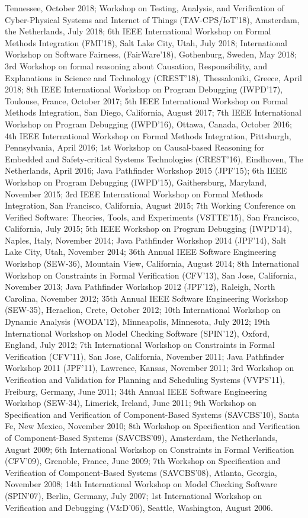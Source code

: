 \documentclass[ComputerScience]{vita}
\begin{document}
\begin{vita}
\begin{Panel and Committee Service}
  Tennessee, October 2018; Workshop on Testing, Analysis, and Verification of Cyber-Physical Systems and Internet of Things (TAV-CPS/IoT'18), Amsterdam, the Netherlands, July 2018; 6th IEEE International Workshop on Formal Methods Integration (FMI'18), Salt Lake City, Utah, July 2018;  International Workshop on Software Fairness, (FairWare'18), Gothenburg, Sweden, May 2018; 3rd Workshop on formal reasoning about Causation, Responsibility, and Explanations in Science and Technology (CREST'18), Thessaloniki, Greece, April 2018; 8th IEEE International Workshop on Program Debugging (IWPD'17), Toulouse, France, October 2017; 5th IEEE International Workshop on Formal Methods Integration, San Diego, California, August 2017; 7th IEEE International Workshop on Program Debugging (IWPD'16), Ottawa, Canada, October 2016; 4th IEEE International Workshop on Formal Methods Integration, Pittsburgh, Pennsylvania, April 2016; 1st Workshop on Causal-based Reasoning for Embedded and Safety-critical Systems Technologies (CREST'16), Eindhoven, The Netherlands, April 2016; Java Pathfinder Workshop 2015 (JPF'15); 6th IEEE Workshop on Program Debugging (IWPD'15), Gaithersburg, Maryland, November 2015; 3rd IEEE International Workshop on Formal Methods Integration, San Francisco, California, August 2015; 7th Working Conference on Verified Software:  Theories, Tools, and Experiments (VSTTE'15), San Francisco, California, July 2015; 5th IEEE Workshop on Program Debugging (IWPD'14), Naples, Italy, November 2014; Java Pathfinder Workshop 2014 (JPF'14), Salt Lake City, Utah, November 2014; 36th Annual IEEE Software Engineering Workshop (SEW-36), Mountain View, California, August 2014; 8th International Workshop on Constraints in Formal Verification (CFV'13), San Jose, California, November 2013; Java Pathfinder Workshop 2012 (JPF'12), Raleigh, North Carolina, November 2012; 35th Annual IEEE Software Engineering Workshop (SEW-35), Heraclion, Crete, October 2012; 10th International Workshop on Dynamic Analysis (WODA'12), Minneapolis, Minnesota, July 2012; 19th International Workshop on Model Checking Software (SPIN'12), Oxford, England, July 2012; 7th International Workshop on Constraints in Formal Verification (CFV'11), San Jose, California, November 2011; Java Pathfinder Workshop 2011 (JPF'11), Lawrence, Kansas, November 2011; 3rd Workshop on Verification and Validation for Planning and Scheduling Systems (VVPS'11), Freiburg, Germany, June 2011; 34th Annual IEEE Software Engineering Workshop (SEW-34), Limerick, Ireland, June 2011; 9th Workshop on Specification and Verification of Component-Based Systems (SAVCBS'10), Santa Fe, New Mexico, November 2010; 8th Workshop on Specification and Verification of Component-Based Systems (SAVCBS'09), Amsterdam, the Netherlands, August 2009; 6th International Workshop on Constraints in Formal Verification (CFV'09), Grenoble, France, June 2009; 7th Workshop on Specification and Verification of Component-Based Systems (SAVCBS'08), Atlanta, Georgia, November 2008; 14th International Workshop on Model Checking Software (SPIN'07), Berlin, Germany, July 2007; 1st International Workshop on Verification and Debugging (V\&D'06), Seattle, Washington, August 2006.
\end{Panel and Committee Service}



\end{vita}
\end{document}
